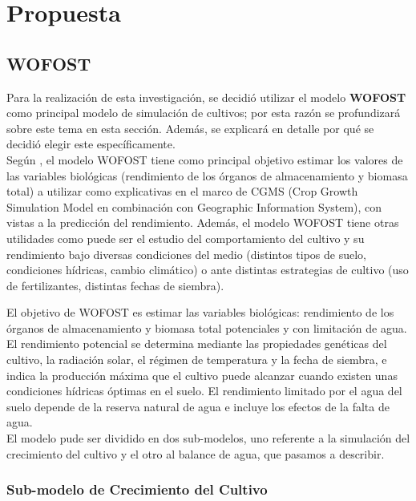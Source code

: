 \chapter{Propuesta}\label{chapter:proposal}

\section{WOFOST}

Para la realización de esta investigación, se decidió utilizar el modelo \textbf{WOFOST} como principal modelo de simulación de cultivos; por esta razón se profundizará sobre este tema en esta sección. Además, se explicará en detalle por qué se decidió elegir este específicamente.\\

Según \parencite{sebem2005aportaciones}, el modelo WOFOST tiene como principal objetivo estimar los valores de las variables biológicas (rendimiento de los órganos de almacenamiento y biomasa total) a utilizar como explicativas en el marco de CGMS (Crop Growth Simulation Model en combinación con Geographic Information System), con vistas a la predicción del rendimiento. Además, el modelo WOFOST tiene otras utilidades como puede ser el estudio del comportamiento del cultivo y su rendimiento bajo diversas condiciones del medio (distintos tipos de suelo, condiciones hídricas, cambio climático) o ante distintas estrategias de cultivo (uso de fertilizantes, distintas fechas de siembra).

El objetivo de WOFOST es estimar las variables biológicas: rendimiento de los órganos de almacenamiento y biomasa total potenciales y con limitación de agua. El rendimiento potencial se determina mediante las propiedades genéticas del cultivo, la radiación solar, el régimen de temperatura y la fecha de siembra, e indica la producción máxima que el cultivo puede alcanzar cuando existen unas condiciones hídricas óptimas en el suelo. El rendimiento limitado por el agua del suelo depende de la reserva natural de agua e incluye los efectos de la falta de agua.\\

El modelo pude ser dividido en dos sub-modelos, uno referente a la simulación del crecimiento del cultivo y el otro al balance de agua, que pasamos a describir.\parencite{sebem2005aportaciones}

\subsection{Sub-modelo de Crecimiento del Cultivo \parencite{sebem2005aportaciones}} 

